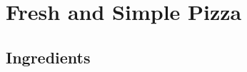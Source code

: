 \thispagestyle{fancy}
\section{Fresh and Simple Pizza}
\AddToShipoutPicture*{\Pizza}

\subsection*{Ingredients}